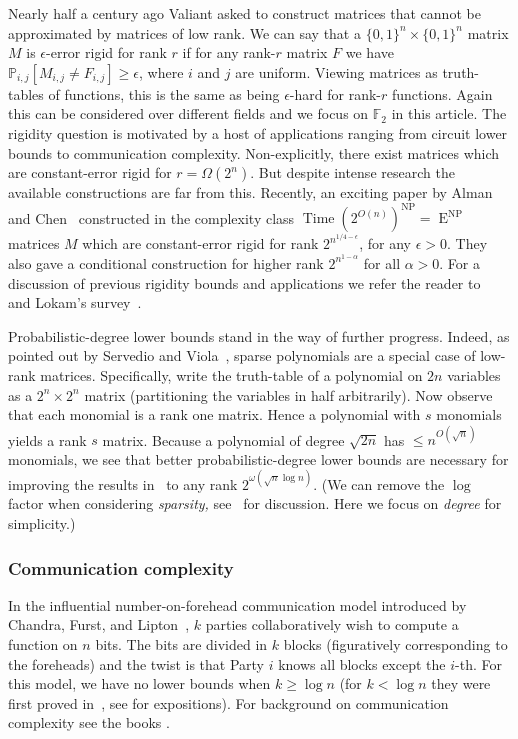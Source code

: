 \documentclass{toc}
\DeclareMathOperator{\Time}{\mathrm{Time}}  %
\DeclareMathOperator{\NP}{\mathrm{NP}}  %
\DeclareMathOperator{\EEE}{\mathrm{E}}  %
\newcommand{\zo}{\{0, 1\}}
\newcommand{\F}{\mathbb{F}}
\renewcommand{\P}{\mathbb{P}}
\newcommand{\e}{\epsilon}
\begin{document}
%
Nearly half a century ago  %
Valiant \cite{Val77} asked to construct
matrices that cannot be approximated by matrices %
of low rank.  %
We can say that a $\zo^{n}\times\zo^{n}$ matrix $M$ is $\e$-error
rigid for rank $r$ if for any rank-$r$ matrix $F$ we have 
$\P_{i,j}[M_{i,j}\ne F_{i,j}]\ge\e$,
where $i$ and $j$ are uniform. Viewing matrices as truth-tables
of functions, this is the same as  %
being  %
$\e$-hard for rank-$r$ functions.
Again this can be considered over different fields and we focus on
$\F_{2}$ in this %
article.  %
The rigidity question is motivated by a host
of applications ranging from circuit lower bounds to communication
complexity. Non-explicitly, there exist matrices which are constant-error
rigid for $r=\Omega(2^{n})$. But despite intense research the available
constructions are far from this. Recently, an exciting %
paper  %
%
%
%
by Alman and Chen~\cite{AlmanC19} 
constructed in the complexity class $\Time(2^{O(n)})^{\NP}=\EEE^{\NP}$
matrices $M$ which are constant-error rigid for rank $2^{n^{1/4-\e}}$,
for any $\e>0$. They also gave a conditional construction for higher
rank $2^{n^{1-\alpha}}$ for all $\alpha>0$. For a discussion of
previous rigidity bounds and applications we refer the reader to~\cite{AlmanC19}
and Lokam's survey~\cite{Lokam09}.

Probabilistic-degree lower bounds stand in the way of further progress.
Indeed, as pointed out by Servedio and Viola~\cite{ServedioV-sparse},
sparse polynomials are a special case of low-rank matrices. Specifically,
write the truth-table of a polynomial on $2n$ variables as a $2^{n}\times2^{n}$
matrix (partitioning the variables in half arbitrarily). Now observe
that each monomial is a rank one matrix. Hence a polynomial with $s$
monomials yields a rank $s$ matrix. Because a polynomial of degree
$\sqrt{2n}$ has $\le n^{O(\sqrt{n})}$ monomials, we see that better
probabilistic-degree lower bounds are necessary for improving the
results in~\cite{AlmanC19} to any rank $2^{\omega(\sqrt{n}\log n)}$.
(We can remove the $\log$ factor when considering \emph{sparsity,
}see~\cite{ServedioV-sparse} for discussion. Here we focus on \emph{degree}
for simplicity.)

\subsubsection{Communication complexity}

In the influential number-on-forehead communication model introduced
by Chandra, Furst, and Lipton~\cite{CFL83}, $k$ parties collaboratively
wish to compute a function on $n$ bits. The bits are divided in $k$
blocks (figuratively corresponding to the foreheads) and the twist
is that Party $i$ knows all blocks except the %
$i$-th.   %
For this model,
we have no lower bounds when $k\ge\log n$ (for $k<\log n$ they were
first proved in~\cite{BNS92}, see \cite{ChT93,Raz00,ViW-GF2} for
expositions). %
%
%
%
%
%
For background on communication complexity see the books
\cite{KuN97,RaoY2019}.
\end{document}

